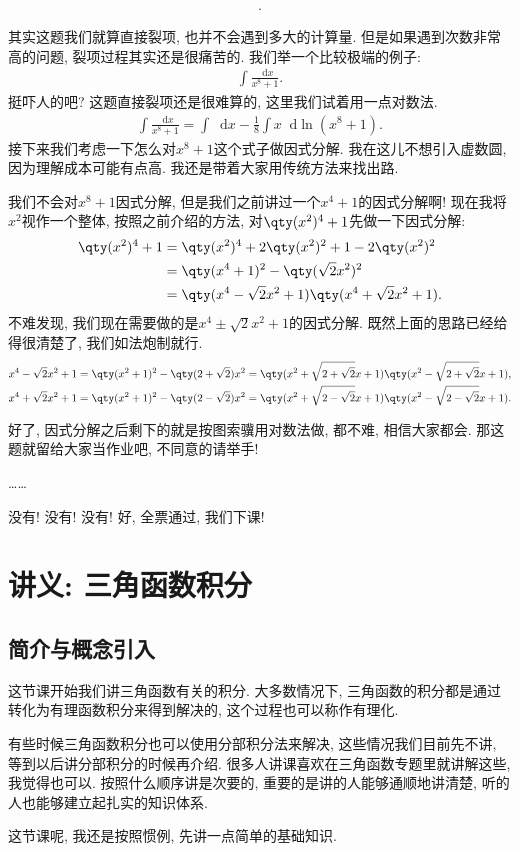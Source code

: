 \documentclass{ctexbook}
\newcommand*{\dif}{\mathop{}\!\mathrm{d}}
\begin{document}
{\begin{align*}
.\end{align*}\par
其实这题我们就算直接裂项, 也并不会遇到多大的计算量. 但是如果遇到次数非常高的问题, 裂项过程其实还是很痛苦的. 我们举一个比较极端的例子: 
\begin{align*}
\int\frac{\dif{x}}{x^{8}+1}
.\end{align*}
挺吓人的吧? 这题直接裂项还是很难算的, 这里我们试着用一点对数法. 
\begin{align*}
\int\frac{\dif{x}}{x^{8}+1}=\int\dif{x}-\frac{1}{8}\int x\dif{\ln(x^{8}+1)}
.\end{align*}
接下来我们考虑一下怎么对$x^{8}+1$这个式子做因式分解. 我在这儿不想引入虚数圆, 因为理解成本可能有点高. 我还是带着大家用传统方法来找出路. \par
我们不会对$x^{8}+1$因式分解, 但是我们之前讲过一个$x^{4}+1$的因式分解啊! 现在我将$x^{2}$视作一个整体, 按照之前介绍的方法, 对$\qty(x^{2})^{4}+1$先做一下因式分解: 
\begin{align*}
\qty(x^{2})^{4}+1={}&\qty(x^{2})^{4}+2\qty(x^{2})^{2}+1-2\qty(x^{2})^{2}\\
={}&\qty(x^{4}+1)^{2}-\qty(\sqrt{2}x^{2})^{2}\\
={}&\qty(x^{4}-\sqrt{2}x^{2}+1)\qty(x^{4}+\sqrt{2}x^{2}+1)
.\end{align*}
不难发现, 我们现在需要做的是$x^{4}\pm\sqrt{2}x^{2}+1$的因式分解. 既然上面的思路已经给得很清楚了, 我们如法炮制就行. 
\begin{align*}
{}&x^{4}-\sqrt{2}x^{2}+1=\qty(x^{2}+1)^{2}-\qty(2+\sqrt{2})x^{2}=\qty(x^{2}+\sqrt{2+\sqrt{2}}x+1)\qty(x^{2}-\sqrt{2+\sqrt{2}}x+1),\\
{}&x^{4}+\sqrt{2}x^{2}+1=\qty(x^{2}+1)^{2}-\qty(2-\sqrt{2})x^{2}=\qty(x^{2}+\sqrt{2-\sqrt{2}}x+1)\qty(x^{2}-\sqrt{2-\sqrt{2}}x+1)
.\end{align*}\par
好了, 因式分解之后剩下的就是按图索骥用对数法做, 都不难, 相信大家都会. 那这题就留给大家当作业吧, 不同意的请举手! \par
……\par
没有! 没有! 没有! 好, 全票通过, 我们下课! \par
\chapter{讲义: 三角函数积分}
\section{简介与概念引入}
这节课开始我们讲三角函数有关的积分. 大多数情况下, 三角函数的积分都是通过转化为有理函数积分来得到解决的, 这个过程也可以称作有理化. \par
有些时候三角函数积分也可以使用分部积分法来解决, 这些情况我们目前先不讲, 等到以后讲分部积分的时候再介绍. 很多人讲课喜欢在三角函数专题里就讲解这些, 我觉得也可以. 按照什么顺序讲是次要的, 重要的是讲的人能够通顺地讲清楚, 听的人也能够建立起扎实的知识体系. \par
这节课呢, 我还是按照惯例, 先讲一点简单的基础知识. 
}
\end{document}
